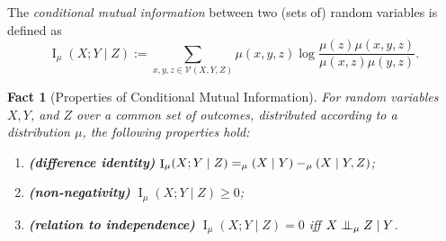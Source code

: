 \documentclass{article}
\theoremstyle{plain}
\newtheorem{fact}[theorem]{Fact}
\theoremstyle{definition}
\theoremstyle{remark}
\let\H\relax
\DeclareMathOperator{\H}{\mathrm{H}} %
\DeclareMathOperator{\I}{\mathrm{I}} %
\newcommand{\CI}{\mathrel{\perp\mspace{-10mu}\perp}} %
\newcommand{\V}{\mathcal V}
\numberwithin{equation}{section}
\begin{document}
\begin{defn}\label{defn:cmi}
   The \emph{conditional mutual information} between two (sets of) random
    variables is defined as  
    \[ \I_\mu(X ; Y \mid Z) := \sum_{x,y,z \in \V(X,Y,Z)} \mu(x,y,z)
        \log\frac{\mu(z) \mu(x,y,z)}{\mu(x,z)\mu(y,z)}. \] 
\end{defn}


\begin{fact}[Properties of Conditional Mutual Information]\label{fact:cmi}
% 
For random variables $X,Y$, and $Z$ over a common set of outcomes,
distributed according to a distribution $\mu$,
the following properties hold:
\begin{enumerate}
    \item \textbf{(difference identity)} $\I_\mu(X ; Y \mid Z) =
                  \H_\mu(X \mid Y) - \H_\mu(X \mid Y, Z)$; 
   \item \textbf{(non-negativity)} $\I_\mu({ X }; { Y} \mid {Z}) \ge 0$;
    \item \textbf{(relation to independence)} $\I_\mu({ X }; { Y}
         \mid { Z}) = 0$ iff $X \CI_\mu Z \mid Y$.
\end{enumerate}
\end{fact}
\end{document}
